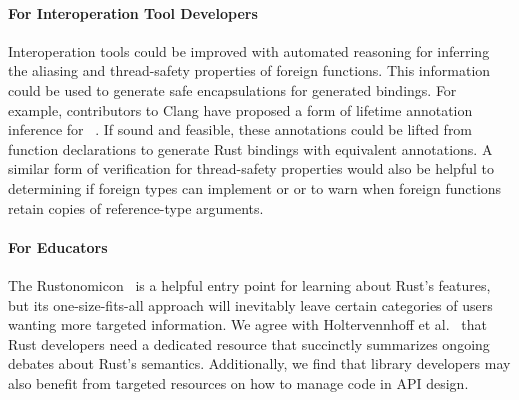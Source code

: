 \paragraph{For Interoperation Tool Developers} Interoperation tools could be improved with automated reasoning for inferring the aliasing and thread-safety properties of foreign functions. This information could be used to generate safe encapsulations for generated bindings. For example, contributors to Clang have proposed a form of lifetime annotation inference for \CC{}~\cite{lifetime_inference}. If sound and feasible, these annotations could be lifted from \CC{} function declarations to generate Rust bindings with equivalent annotations. A similar form of verification for thread-safety properties would also be helpful to determining if foreign types can implement  or  or to warn when foreign functions retain copies of reference-type arguments.

\paragraph{For Educators} The Rustonomicon~\cite{nomicon} is a helpful entry point for learning about Rust's \unsafe features, but its one-size-fits-all approach will inevitably leave certain categories of users wanting more targeted information. We agree with Holtervennhoff et al.~\cite{holtervennhoff23} that Rust developers need a dedicated resource that succinctly summarizes ongoing debates about Rust's semantics. Additionally, we find that library developers may also benefit from targeted resources on how to manage \unsafe code in API design.

